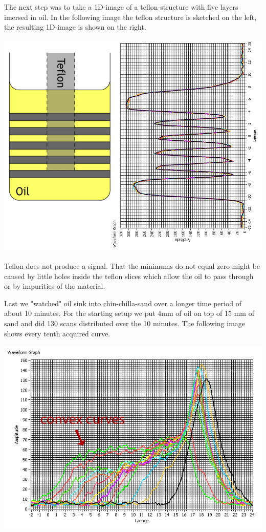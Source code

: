 \documentclass[12pt, english]{scrartcl} %
\begin{document}
\begin{multicols}{2}
The next step was to take a 1D-image of a teflon-structure with five layers imersed in oil. In the following image the teflon structure is sketched on the left, the resulting 1D-image is shown on the right.

\begin{center}
\includegraphics[width=\columnwidth]{graphics/teflon.png}
\label{teflon structure}
\end{center}

Teflon does not produce a signal. That the minimums do not equal zero might be caused by little holes inside the teflon slices which allow the oil to pass through or by impurities of the material.

Last we "watched" oil sink into chin-chilla-sand over a longer time period of about 10 minutes.
For the starting setup we put 4mm of oil on top of 15 mm of sand and did 130 scans distributed over the 10 minutes. The following image shows every tenth acquired curve.

\begin{center}
\includegraphics[width=\columnwidth]{graphics/oil_through_sand.png}
\label{oil through sand}
\end{center}


\end{multicols}
\end{document}
